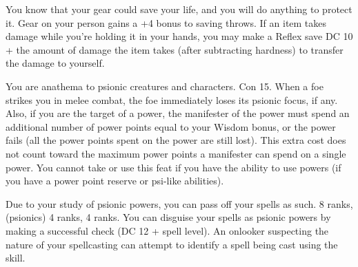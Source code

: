 {You know that your gear could save your life, and you will do anything to protect it.}{}
{Gear on your person gains a +4 bonus to saving throws. If an item takes damage while you're holding it in your hands, you may make a Reflex save DC 10 + the amount of damage the item takes (after subtracting hardness) to transfer the damage to yourself.}{}{}

{You are anathema to psionic creatures and characters.}
{Con 15.}
{When a foe strikes you in melee combat, the foe immediately loses its psionic focus, if any. Also, if you are the target of a power, the manifester of the power must spend an additional number of power points equal to your Wisdom bonus, or the power fails (all the power points spent on the power are still lost). This extra cost does not count toward the maximum power points a manifester can spend on a single power.}{}
{You cannot take or use this feat if you have the ability to use powers (if you have a power point reserve or psi-like abilities).}

{Due to your study of psionic powers, you can pass off your spells as such.}
{ 8 ranks,  (psionics) 4 ranks,  4 ranks.}
{You can disguise your spells as psionic powers by making a successful  check (DC 12 + spell level). An onlooker suspecting the nature of your spellcasting can attempt to identify a spell being cast using the  skill.}{}{}




